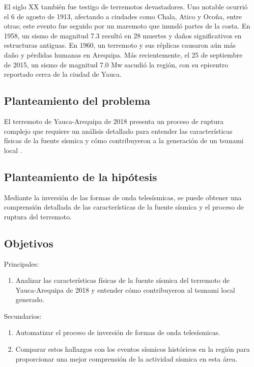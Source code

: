 \documentclass[spanish,a4paper,11pt]{article}
\begin{document}
El siglo XX también fue testigo de terremotos devastadores. Uno notable ocurrió el 6 de agosto de 1913, afectando a ciudades como Chala, Atico y Ocoña, entre otras; este evento fue seguido por un maremoto que inundó partes de la costa. En 1958, un sismo de magnitud 7.3 resultó en 28 muertes y daños significativos en estructuras antiguas. En 1960, un terremoto y sus réplicas causaron aún más daño y pérdidas humanas en Arequipa. Más recientemente, el 25 de septiembre de 2015, un sismo de magnitud 7.0 Mw sacudió la región, con su epicentro reportado cerca de la ciudad de Yauca.

\subsection*{Planteamiento del problema}

El terremoto de Yauca-Arequipa de 2018 presenta un proceso de ruptura complejo que requiere un análisis detallado para entender las características físicas de la fuente sísmica y cómo contribuyeron a la generación de un tsunami local \cite{CEN13}.

\subsection*{Planteamiento de la hipótesis}

Mediante la inversión de las formas de onda telesísmicas, se puede obtener una comprensión detallada de las características de la fuente sísmica y el proceso de ruptura del terremoto.

\subsection*{Objetivos}

Principales:

\begin{enumerate}
  \item Analizar las características físicas de la fuente sísmica del terremoto de Yauca-Arequipa de 2018 y entender cómo contribuyeron al tsunami local generado.
\end{enumerate}

Secundarios:

\begin{enumerate}
  \item Automatizar el proceso de inversión de formas de onda telesísmicas.
  \item Comparar estos hallazgos con los eventos sísmicos históricos en la región para proporcionar una mejor comprensión de la actividad sísmica en esta área.
\end{enumerate}
\end{document}
